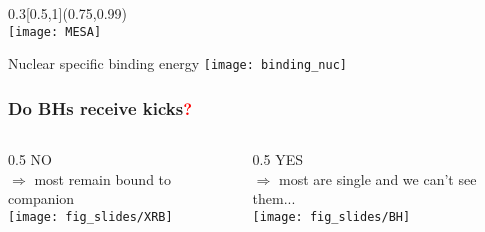 \documentclass[xcolor=dvipsnames,professionalfonts, aspectratio=169]{beamer}
\begin{document}
\begin{frame}
{  }

  \begin{textblock}{0.3}[0.5,1](0.75,0.99)
    \centering
    \small
    \color{gray!50}{\tiny Simulation output from}\\
    \texttt{[image: MESA]}
  \end{textblock}
\end{frame}


\begin{frame}{Nuclear specific binding energy}
  \centering
  \texttt{[image: binding\_nuc]}
\end{frame}

\begin{frame}[c]
  \frametitle{Do BHs receive kicks\textcolor{red}{\bf ?}}
  \vspace*{5pt}
  \begin{columns}
    \begin{column}{0.5\textwidth}
      \centering
      {\Huge NO}\\
      {$\Rightarrow$ most remain bound to companion}\\[20pt]
      \texttt{[image: fig\_slides/XRB]}
    \end{column}
    \begin{column}{0.5\textwidth}
      \centering
      {\Huge YES}\\
      {$\Rightarrow$ most are single and we can't see them...}\\[20pt]
      \texttt{[image: fig\_slides/BH]}
  \end{column}
\end{columns}


\end{frame}
\end{document}
